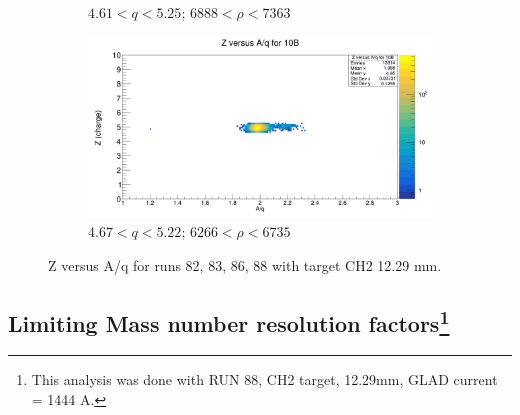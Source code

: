 \documentclass[12pt, letterpaper]{article}
\begin{document}
\begin{figure}[!htbp]
\begin{subfigure}{.5\textwidth}
  \caption{$4.61 < q < 5.25$; $6888 < \rho < 7363$}
  \label{fig:sub-second}
\end{subfigure}
\begin{subfigure}{.5\textwidth}
  \centering
  \includegraphics[width=.9\linewidth]{z_vs_aq_10b.png} 
  \caption{$4.67 < q < 5.22$; $ 6266 < \rho < 6735$}
  \label{fig:sub-second}
\end{subfigure}
\caption{Z versus A/q for runs 82, 83, 86, 88 with target CH2 12.29 mm.}
\label{fig:iso_fit}
\end{figure}


\subsection{Limiting Mass number resolution factors\footnote{This analysis was done with RUN 88, CH2 target, 12.29mm, GLAD current = 1444 A.}}
\end{document}
